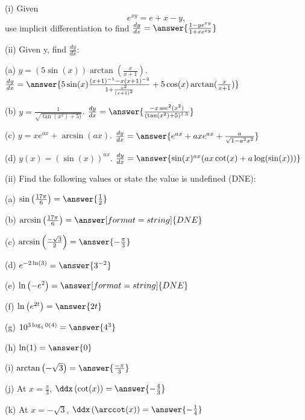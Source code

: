 \documentclass{ximera}
\begin{document}
\begin{exercise}
(i) Given $$e^{xy}=e+x-y,$$ use implicit differentiation to find $\frac{dy}{dx}=\answer{\frac{1-ye^{xy}}{1+xe^{xy}}}$

(ii) Given y, find $\frac{dy}{dx}$:

(a) $y=\left(5\sin(x)\right)\arctan\left(\frac{x}{x+1}\right)$. $\frac{dy}{dx}=\answer{5\sin(x)\frac{(x+1)^{-1}-x(x+1)^{-2}}{1+\frac{x^2}{(x+1)^2}}+5\cos(x)\arctan(\frac{x}{x+1})}$

(b) $y=\frac{1}{\sqrt{\tan(x^2)+5)}}$. $\frac{dy}{dx}=\answer{\frac{-x\sec^2(x^2)}{(\tan(x^2)+5)^{1.5}}}$

(c) $y=xe^{ax}+\arcsin(ax)$. $\frac{dy}{dx}=\answer{e^{ax}+axe^{ax}+\frac{a}{\sqrt{1-a^2x^2}}}$

(d) $y(x)=\left(\sin(x)\right)^{ax}$. $\frac{dy}{dx}=\answer{\sin(x)^{ax}(ax\cot(x)+a\log(\sin(x)))}$

(ii) Find the following values or state the value is undefined (DNE):

(a) $\sin\left(\frac{17\pi}{6}\right)=\answer{\frac{1}{2}}$

(b) $\arcsin\left(\frac{17\pi}{6}\right)=\answer[format=string]{DNE}$

(c) $\arcsin\left(\frac{-\sqrt{3}}{2}\right)=\answer{-\frac{\pi}{3}}$

(d) $e^{-2\ln(3)}=\answer{3^{-2}}$

(e) $\ln\left(-e^2\right)=\answer[format=string]{DNE}$

(f) $\ln\left(e^{2t}\right)=\answer{2t}$

(g) $10^{3\log_10(4)}=\answer{4^3}$

(h) $\ln(1)=\answer{0}$

(i) $\arctan\left(-\sqrt{3}\right)=\answer{\frac{-\pi}{3}}$

(j) At $x=\frac{\pi}{3}$, $\ddx\left(\cot(x)\right)=\answer{-\frac{4}{3}}$

(k) At $x=-\sqrt{3}$, $\ddx\left(\arccot(x)\right)=\answer{-\frac{1}{4}}$
\end{exercise}
\end{document}
